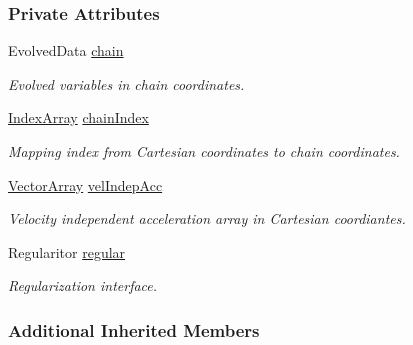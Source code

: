 \subsubsection*{Private Attributes}
\begin{DoxyCompactItemize}
\item 
Evolved\+Data \mbox{\hyperlink{class_a_rchain_3_01_newtonian_3_01typename_01_evolved_data_1_1_scalar_01_4_00_01_evolved_data_00_01_regularitor_01_4_a39576accb53257bdb1b55e6d21acdf0f}{chain}}
\begin{DoxyCompactList}\small\item\em Evolved variables in chain coordinates. \end{DoxyCompactList}\item 
\mbox{\hyperlink{class_a_rchain_3_01_newtonian_3_01typename_01_evolved_data_1_1_scalar_01_4_00_01_evolved_data_00_01_regularitor_01_4_a0072f8585c3e6ba8d64cb81be90fb376}{Index\+Array}} \mbox{\hyperlink{class_a_rchain_3_01_newtonian_3_01typename_01_evolved_data_1_1_scalar_01_4_00_01_evolved_data_00_01_regularitor_01_4_a6a8ef156105e2f80dc143606d4ba10c9}{chain\+Index}}
\begin{DoxyCompactList}\small\item\em Mapping index from Cartesian coordinates to chain coordinates. \end{DoxyCompactList}\item 
\mbox{\hyperlink{class_a_rchain_3_01_newtonian_3_01typename_01_evolved_data_1_1_scalar_01_4_00_01_evolved_data_00_01_regularitor_01_4_a1ff7d2e64f488df9edae2ad796945bbd}{Vector\+Array}} \mbox{\hyperlink{class_a_rchain_3_01_newtonian_3_01typename_01_evolved_data_1_1_scalar_01_4_00_01_evolved_data_00_01_regularitor_01_4_af0862cdda12b7ba2ba5d5d098d008398}{vel\+Indep\+Acc}}
\begin{DoxyCompactList}\small\item\em Velocity independent acceleration array in Cartesian coordiantes. \end{DoxyCompactList}\item 
Regularitor \mbox{\hyperlink{class_a_rchain_3_01_newtonian_3_01typename_01_evolved_data_1_1_scalar_01_4_00_01_evolved_data_00_01_regularitor_01_4_a6e5a31aa07620ab9f3503ebc412ff969}{regular}}
\begin{DoxyCompactList}\small\item\em Regularization interface. \end{DoxyCompactList}\end{DoxyCompactItemize}
\subsubsection*{Additional Inherited Members}


